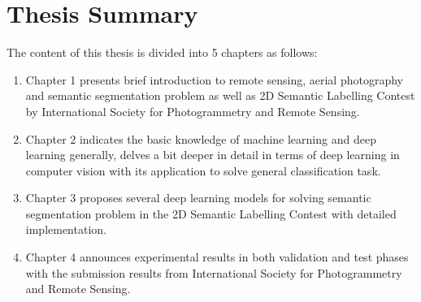 \chapter*{Thesis Summary}
The content of this thesis is divided into 5 chapters as follows:
\begin{enumerate}
  \item Chapter 1 presents brief introduction to remote sensing, aerial
  photography and semantic segmentation problem as well as 2D Semantic
  Labelling Contest by International Society for Photogrammetry and Remote
  Sensing.
  \item Chapter 2 indicates the basic knowledge of machine learning and deep
  learning generally, delves a bit deeper in detail in terms of deep learning
  in computer vision with its application to solve general classification task.
  \item Chapter 3 proposes several deep learning models for solving semantic
  segmentation problem in the 2D Semantic Labelling Contest with detailed
  implementation.
  \item Chapter 4 announces experimental results in both validation and test
  phases with the submission results from International Society for
  Photogrammetry and Remote Sensing.
\end{enumerate}
